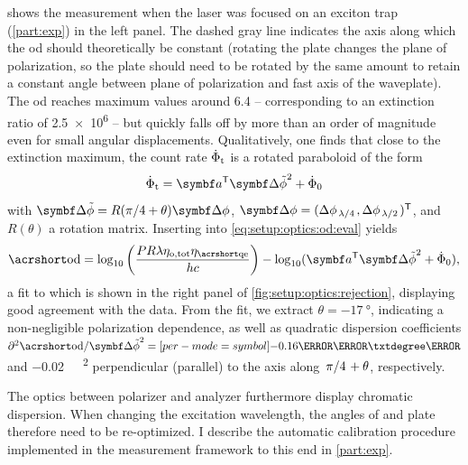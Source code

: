  shows the measurement when the laser was focused on an exciton trap (\cf \cref{part:exp}) in the left panel.
The dashed gray line indicates the axis along which the \gls{od} should theoretically be constant (rotating the \halfwave plate changes the plane of polarization, so the \quarterwave plate should need to be rotated by the same amount to retain a constant angle between plane of polarization and fast axis of the waveplate).
The \gls{od} reaches maximum values around \num{6.4} -- corresponding to an extinction ratio of \num{2.5e6} -- but quickly falls off by more than an order of magnitude even for small angular displacements.
Qualitatively, one finds that close to the extinction maximum, the count rate $\dot{\Phi}_{\mathrm{t}}$ is a rotated paraboloid of the form
\begin{equation}
    \dot{\Phi}_{\mr{t}} = \bvec{a}\transpose\bvec{\Delta\tilde{\phi}}^2 + \dot{\Phi}_0
\end{equation}
with $\bvec{\Delta\tilde{\phi}} = R(\pi/4+\theta)\bvec{\Delta\phi}$, $\bvec{\Delta\phi} = (\Delta\phi_{\quarterwave},\Delta\phi_{\halfwave})\transpose$, and $R(\theta)$ a rotation matrix.
Inserting into \cref{eq:setup:optics:od:eval} yields
\begin{equation}\label{eq:setup:optics:od:fit}
    \OD = \log_{10}\left(\frac{P R\lambda\eta_{\mr{o,tot}}\eta_{\QE}}{h c}\right) - \log_{10}(\bvec{a}\transpose\bvec{\Delta\tilde{\phi}}^2 + \dot{\Phi}_0),
\end{equation}
a fit to which is shown in the right panel of \cref{fig:setup:optics:rejection}, displaying good agreement with the data.
From the fit, we extract $\theta=\qty{-17}{\degree}$, indicating a non-negligible polarization dependence, as well as quadratic dispersion coefficients $\partial^2\OD/\bvec{\Delta\tilde{\phi}}^2=\qty[per-mode=symbol]{-0.16}{\per\milli\txtdegree\squared}$ and \qty[per-mode=symbol]{-0.02}{\per\milli\txtdegree\squared} perpendicular (parallel) to the axis along $\flatfrac{\pi}{4}+\theta$, respectively.

The optics between polarizer and analyzer furthermore display chromatic dispersion.
When changing the excitation wavelength, the angles of \halfwave and \quarterwave plate therefore need to be re-optimized.
I describe the automatic calibration procedure implemented in the measurement framework to this end in \cref{part:exp}.

